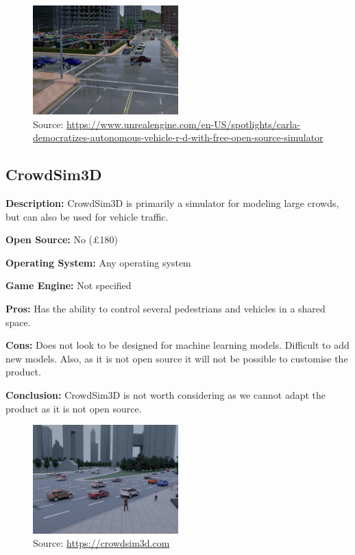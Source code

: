 \begin{figure}[H]
    \centering
    \includegraphics[width=0.5\textwidth]{Simulators/Carla.JPG}
    \caption{Source: \url{https://www.unrealengine.com/en-US/spotlights/carla-democratizes-autonomous-vehicle-r-d-with-free-open-source-simulator}}
\end{figure}


\subsection{CrowdSim3D}
\textbf{Description:} CrowdSim3D is primarily a simulator for modeling large crowds, but can also be used for vehicle traffic. 

\textbf{Open Source:} No (£180)

\textbf{Operating System:} Any operating system

\textbf{Game Engine:} Not specified

\textbf{Pros:} Has the ability to control several pedestrians and vehicles in a shared space.

\textbf{Cons:} Does not look to be designed for machine learning models. Difficult to add new models. Also, as it is not open source it will not be possible to customise the product. 

\textbf{Conclusion:} CrowdSim3D is not worth considering as we cannot adapt the product as it is not open source. 

\begin{figure}[H]
    \centering
    \includegraphics[width=0.5\textwidth]{Simulators/CrowdSim.JPG}
    \caption{Source: \url{https://crowdsim3d.com}}
\end{figure}


